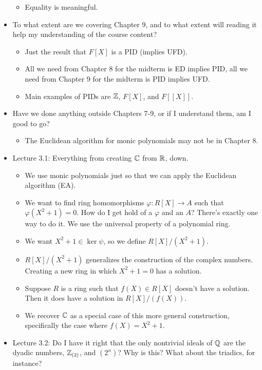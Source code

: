 \documentclass[../notes.tex]{subfiles}
\begin{document}
\begin{itemize}
\begin{itemize}
        \item Equality is meaningful.
    \end{itemize}
    \item To what extent are we covering Chapter 9, and to what extent will reading it help my understanding of the course content?
    \begin{itemize}
        \item Just the result that $F[X]$ is a PID (implies UFD).
        \item All we need from Chapter 8 for the midterm is ED implies PID, all we need from Chapter 9 for the midterm is PID implies UFD.
        \item Main examples of PIDs are $\mathbb{Z}$, $F[X]$, and $F[[X]]$.
    \end{itemize}
    \item Have we done anything outside Chapters 7-9, or if I understand them, am I good to go?
    \begin{itemize}
        \item The Euclidean algorithm for monic polynomials may not be in Chapter 8.
    \end{itemize}
    \item Lecture 3.1: Everything from creating $\mathbb{C}$ from $\mathbb{R}$, down.
    \begin{itemize}
        \item We use monic polynomials just so that we can apply the Euclidean algorithm (EA).
        \item We want to find ring homomorphisms $\varphi:R[X]\to A$ such that $\varphi(X^2+1)=0$. How do I get hold of a $\varphi$ and an $A$? There's exactly one way to do it. We use the universal property of a polynomial ring.
        \item We want $X^2+1\in\ker\psi$, so we define $R[X]/(X^2+1)$.
        \item $R[X]/(X^2+1)$ generalizes the construction of the complex numbers. Creating a new ring in which $X^2+1=0$ has a solution.
        \item Suppose $R$ is a ring such that $f(X)\in R[X]$ doesn't have a solution. Then it does have a solution in $R[X]/(f(X))$.
        \item We recover $\mathbb{C}$ as a special case of this more general construction, specifically the case where $f(X)=X^2+1$.
    \end{itemize}
    \item Lecture 3.2: Do I have it right that the only nontrivial ideals of $\mathbb{Q}$ are the dyadic numbers, $\mathbb{Z}_{(2)}$, and $(2^n)$? Why is this? What about the triadics, for instance?

\end{itemize}
\end{document}
